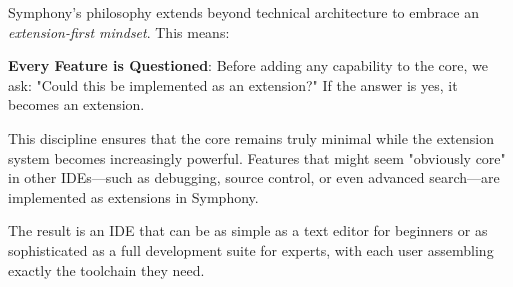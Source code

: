 Symphony's philosophy extends beyond technical architecture to embrace an \textit{extension-first mindset}. This means:

\begin{alertbox}
\textbf{Every Feature is Questioned}: Before adding any capability to the core, we ask: "Could this be implemented as an extension?" If the answer is yes, it becomes an extension.
\end{alertbox}

This discipline ensures that the core remains truly minimal while the extension system becomes increasingly powerful. Features that might seem "obviously core" in other IDEs—such as debugging, source control, or even advanced search—are implemented as extensions in Symphony.

The result is an IDE that can be as simple as a text editor for beginners or as sophisticated as a full development suite for experts, with each user assembling exactly the toolchain they need.
